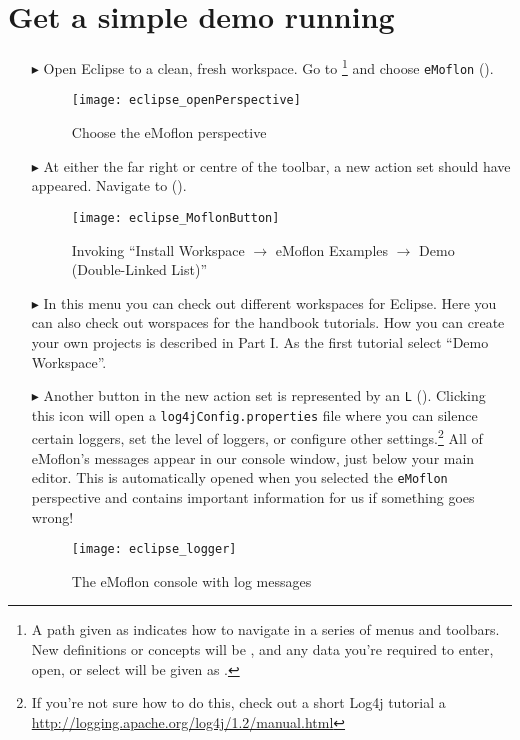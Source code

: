 \newpage
\genHeader

\section{Get a simple demo running}


\begin{itemize}
\hypertarget{simpleDemo common}{} 
\item[$\blacktriangleright$]
Open Eclipse to a clean, fresh workspace.
Go to  \footnote{A path given as  indicates how to navigate in a series of menus and toolbars.
New definitions or concepts will be , and any data you're required to enter, open, or select will be given as .} and choose \texttt{eMoflon} ().

\begin{figure}[htbp]
	\centering
  \texttt{[image: eclipse\_openPerspective]}
	\caption{Choose the eMoflon perspective}
	\label{eclipse:openPerspective}
\end{figure} 

\item[$\blacktriangleright$] At either the far right or centre of the toolbar, a new action set should have appeared.
Navigate to  
().
%
\vspace{0.5cm}
\begin{figure}[htbp]
	\centering
  \texttt{[image: eclipse\_MoflonButton]}
	\caption{Invoking \enquote{Install Workspace $\to$ eMoflon Examples $\to$ Demo (Double-Linked List)}}
	\label{eclipse:newMetamodel}
\end{figure}

\newpage

\item[$\blacktriangleright$] In this menu you can check out different workspaces for Eclipse. Here you can also check out worspaces for the handbook tutorials. How you can create your own projects is described in Part I. As the first tutorial select ``Demo Workspace''. 

\item[$\blacktriangleright$]  Another button in the new action set is  represented by an \texttt{L} ().
Clicking this icon will open a \texttt{log4jConfig.properties} file where you can silence certain loggers, set the level of loggers, or configure other
settings.\footnote{If you're not sure how to do this, check out a short Log4j tutorial a \url{http://logging.apache.org/log4j/1.2/manual.html}} All of eMoflon's
messages appear in our console window, just below your main editor. This is automatically opened when you selected the \texttt{eMoflon} perspective and
contains important information for us if something goes wrong!

\begin{figure}[htbp]
	\centering
  \texttt{[image: eclipse\_logger]}
	\caption{The eMoflon console with log messages}
	\label{eclipse:logger}
\end{figure} 
\end{itemize}



